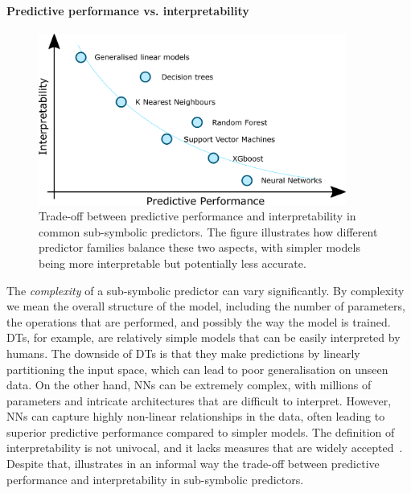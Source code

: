 \paragraph{Predictive performance vs. interpretability}
%
\begin{figure}[h]
    \centering
    \includegraphics[width=0.9\textwidth]{figures/interpretability-performance-tradeoff}
    \caption[Performance vs. interpretability trade-off]{
        Trade-off between predictive performance and interpretability in common sub-symbolic predictors.
        The figure illustrates how different predictor families balance these two aspects, with simpler models being more interpretable but potentially less accurate.
    }
    \label{fig:performance-vs-interpretability}
\end{figure}
%
The \emph{complexity} of a sub-symbolic predictor can vary significantly.
%
By complexity we mean the overall structure of the model, including the number of parameters, the operations that are performed, and possibly the way the model is trained.
%
\Glspl{DT}, for example, are relatively simple models that can be easily interpreted by humans.
%
The downside of \glspl{DT} is that they make predictions by linearly partitioning the input space, which can lead to poor generalisation on unseen data.
%
On the other hand, \glspl{NN} can be extremely complex, with millions of parameters and intricate architectures that are difficult to interpret.
%
However, \glspl{NN} can capture highly non-linear relationships in the data, often leading to superior predictive performance compared to simpler models.
%
The definition of interpretability is not univocal, and it lacks measures that are widely accepted~\cite{DBLP:journals/natmi/Rudin19}.
%
Despite that,  illustrates in an informal way the trade-off between predictive performance and interpretability in sub-symbolic predictors.


